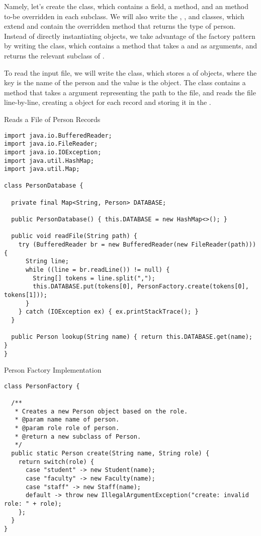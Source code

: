 Namely, let's create the   class, which contains a  field, a  method, and an   method to-be overridden in each subclass. We will also write the , , and  classes, which extend  and contain the overridden  method that returns the type of person. Instead of directly instantiating  objects, we take advantage of the factory pattern by writing the  class, which contains a  method that takes a  and  as arguments, and returns the relevant subclass of .

To read the input file, we will write the  class, which stores a  of  objects, where the key is the name of the person and the value is the  object. The  class contains a  method that takes a  argument representing the path to the file, and reads the file line-by-line, creating a  object for each record and storing it in the .

\begin{cl}{Reads a File of Person Records}
\begin{lstlisting}[language=MyJava]
import java.io.BufferedReader;
import java.io.FileReader;
import java.io.IOException;
import java.util.HashMap;
import java.util.Map;

class PersonDatabase {

  private final Map<String, Person> DATABASE;

  public PersonDatabase() { this.DATABASE = new HashMap<>(); }

  public void readFile(String path) {
    try (BufferedReader br = new BufferedReader(new FileReader(path))) {
      String line;
      while ((line = br.readLine()) != null) {
        String[] tokens = line.split(",");
        this.DATABASE.put(tokens[0], PersonFactory.create(tokens[0], tokens[1]));
      }
    } catch (IOException ex) { ex.printStackTrace(); }
  }

  public Person lookup(String name) { return this.DATABASE.get(name); }
}
\end{lstlisting}
\end{cl}

\begin{cl}{Person Factory Implementation}
\begin{lstlisting}[language=MyJava]
class PersonFactory {
  
  /**
   * Creates a new Person object based on the role.
   * @param name name of person.
   * @param role role of person.
   * @return a new subclass of Person.
   */
  public static Person create(String name, String role) {
    return switch(role) {
      case "student" -> new Student(name);
      case "faculty" -> new Faculty(name);
      case "staff" -> new Staff(name);
      default -> throw new IllegalArgumentException("create: invalid role: " + role);
    };
  }
}
\end{lstlisting}
\end{cl}

